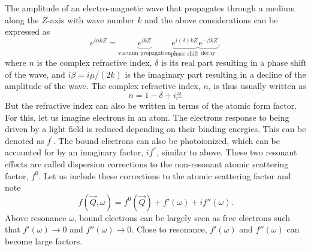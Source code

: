 The amplitude of an electro-magnetic wave that propagates through a medium along the $Z$-axis with wave number $k$ and the above considerations can be expressed as \citep{Attwood-2007-CUP}
\begin{equation}
e^{i n k Z}= \underbrace{e^{i k Z}}_{\text{vacuum propagation}} \underbrace{e^{i \left(\delta\right)k Z}}_{\text{phase shift}} \underbrace{e^{-\beta k Z}}_{\text{decay}},
\label{eq:wave-in-medium}
\end{equation}
where $n$ is the complex refractive index, $\delta$ is its real part resulting in a phase shift of the wave, and $i \beta=i \mu/(2 k)$ is the imaginary part resulting in a decline of the amplitude of the wave. The complex refractive index, $n$, is thus usually written as
\begin{equation}
n=1-\delta+i\beta.
\label{eq:complex-refractive-index}
\end{equation}
But the refractive index can also be written in terms of the atomic form factor. For this, let us imagine electrons in an atom. The electrons response to being driven by a light field is reduced depending on their binding energies. This can be denoted as $f^{'}$. The bound electrons can also be photoionized, which can be accounted for by an imaginary factor, $i f^{''}$, similar to above. These two resonant effects are called dispersion corrections to the non-resonant atomic scattering factor, $f^{0}$. Let us include these corrections to the atomic scattering factor and note
\begin{equation}
f\left(\vec{Q},\omega\right)=f^{0}\left(\vec{Q}\right)+f'\left(\omega\right)+i f''\left(\omega\right).
\label{eq:scattering-factor-dispersion-corr}
\end{equation}
Above resonance $\omega$, bound electrons can be largely seen as free electrons such that $f'\left(\omega\right)\rightarrow 0$ and $f''\left(\omega\right)\rightarrow 0$. Close to resonance, $f'\left(\omega\right)$ and $f''\left(\omega\right)$ can become large factors.\\[1\baselineskip]
%
